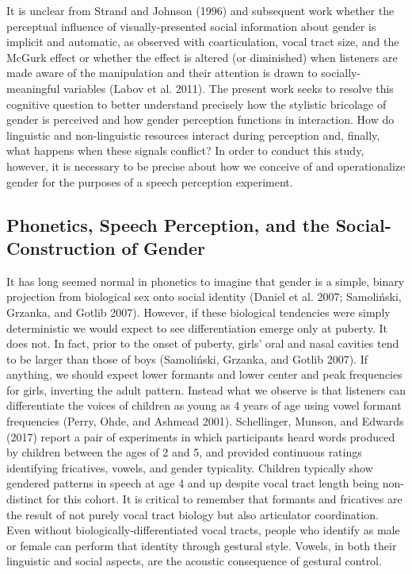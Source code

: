 \documentclass[
  letterpaper,
  DIV=11,
  numbers=noendperiod]{scrartcl}
\begin{document}
It is unclear from Strand and Johnson (1996) and subsequent work whether
the perceptual influence of visually-presented social information about
gender is implicit and automatic, as observed with coarticulation, vocal
tract size, and the McGurk effect or whether the effect is altered (or
diminished) when listeners are made aware of the manipulation and their
attention is drawn to socially-meaningful variables (Labov et al. 2011).
The present work seeks to resolve this cognitive question to better
understand precisely how the stylistic bricolage of gender is perceived
and how gender perception functions in interaction. How do linguistic
and non-linguistic resources interact during perception and, finally,
what happens when these signals conflict? In order to conduct this
study, however, it is necessary to be precise about how we conceive of
and operationalize gender for the purposes of a speech perception
experiment.

\subsection{Phonetics, Speech Perception, and the Social-Construction of
Gender}\label{sub-gender}

It has long seemed normal in phonetics to imagine that gender is a
simple, binary projection from biological sex onto social identity
(Daniel et al. 2007; Samoliński, Grzanka, and Gotlib 2007). However, if
these biological tendencies were simply deterministic we would expect to
see differentiation emerge only at puberty. It does not. In fact, prior
to the onset of puberty, girls' oral and nasal cavities tend to be
larger than those of boys (Samoliński, Grzanka, and Gotlib 2007). If
anything, we should expect lower formants and lower center and peak
frequencies for girls, inverting the adult pattern. Instead what we
observe is that listeners can differentiate the voices of children as
young as 4 years of age using vowel formant frequencies (Perry, Ohde,
and Ashmead 2001). Schellinger, Munson, and Edwards (2017) report a pair
of experiments in which participants heard words produced by children
between the ages of 2 and 5, and provided continuous ratings identifying
fricatives, vowels, and gender typicality. Children typically show
gendered patterns in speech at age 4 and up despite vocal tract length
being non-distinct for this cohort. It is critical to remember that
formants and fricatives are the result of not purely vocal tract biology
but also articulator coordination. Even without
biologically-differentiated vocal tracts, people who identify as male or
female can perform that identity through gestural style. Vowels, in both
their linguistic and social aspects, are the acoustic consequence of
gestural control.
\end{document}
